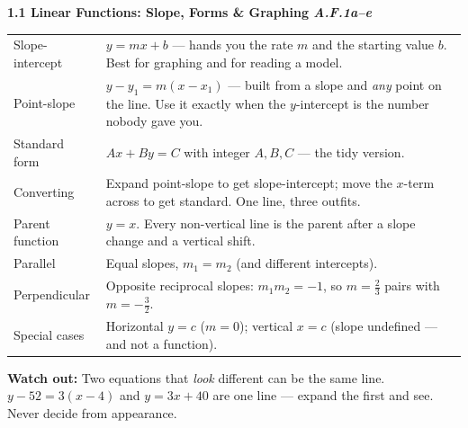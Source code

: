 \documentclass[10pt]{article}
\newcommand{\sghead}[2]{%
  \boxguard[10]%
  \vspace{4pt}\par\noindent
  \colorbox{forest}{\parbox{\dimexpr\linewidth-2\fboxsep}{%
    \small\color{white}\bfseries #1 \hfill \textmd{\itshape\scriptsize\color{forestmid} #2}}}%
  \vspace{2pt}\par}
\newcommand{\sgwatch}[1]{%
  \vspace{1pt}\par\noindent
  \colorbox{redbg}{\parbox{\dimexpr\linewidth-2\fboxsep}{%
    \footnotesize\textbf{\textcolor{redacc}{Watch out:}} #1}}%
  \vspace{1pt}\par}
\newcommand{\sgtabsetup}{\renewcommand{\arraystretch}{1.06}\footnotesize}
\begin{document}
\sghead{1.1 \quad Linear Functions: Slope, Forms \& Graphing}{A.F.1a--e}
{\sgtabsetup
\begin{tabularx}{\linewidth}{@{} G X @{}}
Slope-intercept & $y=mx+b$ --- hands you the rate $m$ and the starting value $b$. Best for
  graphing and for reading a model. \\
Point-slope & $y-y_1=m(x-x_1)$ --- built from a slope and \emph{any} point on the line. Use it
  exactly when the $y$-intercept is the number nobody gave you. \\
Standard form & $Ax+By=C$ with integer $A,B,C$ --- the tidy version. \\
Converting & Expand point-slope to get slope-intercept; move the $x$-term across to get standard.
  One line, three outfits. \\
Parent function & $y=x$. Every non-vertical line is the parent after a slope change and a
  vertical shift. \\
Parallel & Equal slopes, $m_1=m_2$ (and different intercepts). \\
Perpendicular & Opposite reciprocal slopes: $m_1m_2=-1$, so $m=\tfrac{2}{3}$ pairs with
  $m=-\tfrac{3}{2}$. \\
Special cases & Horizontal $y=c$ ($m=0$); vertical $x=c$ (slope undefined --- and not a
  function). \\
\end{tabularx}}
\sgwatch{Two equations that \emph{look} different can be the same line. $y-52=3(x-4)$ and
$y=3x+40$ are one line --- expand the first and see. Never decide from appearance.}
\end{document}
